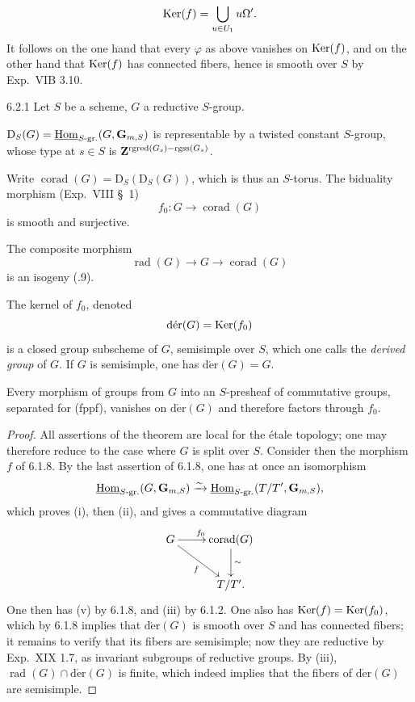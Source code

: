 \[
\operatorname{Ker}(f)=\bigcup_{u\in U_1}u\Omega'.
\]
It follows on the one hand that every $\varphi$ as above vanishes on $\operatorname{Ker}(f)$, and on the other hand that $\operatorname{Ker}(f)$ has connected fibers, hence is smooth over $S$ by Exp.~VIB 3.10.

\begin{theorem}{6.2.1}\label{XXII.6.2.1}
Let $S$ be a scheme, $G$ a reductive $S$-group.
\begin{enumeratei}
\item $\mathrm D_S(G)=\underline{\operatorname{Hom}}_{S\text{-gr.}}(G,\mathbf G_{m,S})$ is representable by a twisted constant $S$-group, whose type at $s\in S$ is $\mathbf{Z}^{\operatorname{rgred}(G_s)-\operatorname{rgss}(G_s)}$.
\item Write $\operatorname{corad}(G)=\mathrm D_S(\mathrm D_S(G))$, which is thus an $S$-torus. The biduality morphism (\cf Exp.~VIII \S~1)
\[
f_0:G\to\operatorname{corad}(G)
\]
is smooth and surjective.
\item The composite morphism
\[
\operatorname{rad}(G)\to G\to\operatorname{corad}(G)
\]
is an isogeny (.9).
\item The kernel of $f_0$, denoted
\[
\operatorname{d\acute er}(G)=\operatorname{Ker}(f_0)
\]
is a closed group subscheme of $G$, semisimple over $S$, which one calls the \emph{derived group} of $G$. If $G$ is semisimple, one has $\operatorname{d\acute er}(G)=G$.
\item Every morphism of groups from $G$ into an $S$-presheaf of commutative groups, separated for (fppf), vanishes on $\operatorname{d\acute er}(G)$ and therefore factors through $f_0$.
\end{enumeratei}
\end{theorem}
\begin{proof}
All assertions of the theorem are local for the \'etale topology; one may therefore reduce to the case where $G$ is split over $S$. Consider then the morphism $f$ of 6.1.8. By the last assertion of 6.1.8, one has at once an isomorphism
\[
\underline{\operatorname{Hom}}_{S\text{-gr.}}(G,\mathbf G_{m,S})\xrightarrow{\sim}\underline{\operatorname{Hom}}_{S\text{-gr.}}(T/T',\mathbf G_{m,S}),
\]
which proves (i), then (ii), and gives a commutative diagram
\[
\xymatrix{G\ar[r]^{f_0}\ar[dr]_f&\operatorname{corad}(G)\ar[d]^\sim\\&T/T'.}
\]
One then has (v) by 6.1.8, and (iii) by 6.1.2. One also has $\operatorname{Ker}(f)=\operatorname{Ker}(f_0)$, which by 6.1.8 implies that $\operatorname{d\acute er}(G)$ is smooth over $S$ and has connected fibers; it remains to verify that its fibers are semisimple; now they are reductive by Exp.~XIX 1.7, as invariant subgroups of reductive groups. By (iii), $\operatorname{rad}(G)\cap\operatorname{d\acute er}(G)$ is finite, which indeed implies that the fibers of $\operatorname{d\acute er}(G)$ are semisimple.
\end{proof}
